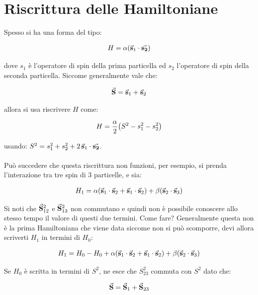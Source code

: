 
\section{Riscrittura delle Hamiltoniane}

	Spesso si ha una forma del tipo:
	
\begin{align*}
	H = \alpha \qty(\va{s}_1 \cdot \va{s_2})
\end{align*}

	dove $s_1$ è l'operatore di spin della prima particella ed $s_2$ l'operatore di spin della seconda particella. Siccome generalmente vale che:
	
\begin{align*}
	\va{S} = \va{s}_1 + \va{s}_2
\end{align*}

	allora si usa riscrivere $H$ come:

\begin{align*}
	H = \frac{\alpha}{2} \qty(S^2 - s_1^2 - s_2^2)
\end{align*}

	usando: $S^2 = s_1^2 + s_2^2 + 2 \, \va{s}_1 \cdot \va{s_2}$.
	\\
	\\
	Può succedere che questa riscrittura non funzioni, per esempio, si prenda l'interazione tra tre spin di 3 particelle, e sia:
	
\begin{align*}
	H_1 = \alpha \qty(\va{s}_1 \cdot \va{s}_2 + \va{s}_1 \cdot \va{s}_2) + \beta \qty(\va{s}_2 \cdot \va{s}_3)
\end{align*}

	Si noti che $\va{S}_{12}^2$ e $\va{S}_{13}^2$ non commutano e quindi non è possibile conoscere allo stesso tempo il valore di questi due termini. Come fare? Generalmente questa non è la prima Hamiltoniana che viene data siccome non si può scomporre, devi allora scriverti $H_1$ in termini di $H_0$:
	
\begin{align*}
	H_1 = H_0 - H_0 + \alpha \qty(\va{s}_1 \cdot \va{s}_2 + \va{s}_1 \cdot \va{s}_2) + \beta \qty(\va{s}_2 \cdot \va{s}_3)
\end{align*}

	Se $H_0$ è scritta in termini di $S^2$, ne esce che $S_{23}^2$ commuta con $S^2$ dato che:
	
\begin{align*}
	\va{S} = \va{S}_1 + \va{S}_{23}
\end{align*}


